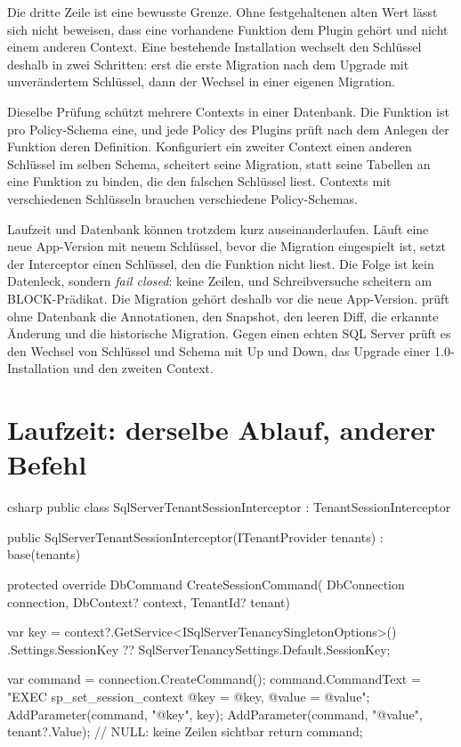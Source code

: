 Die dritte Zeile ist eine bewusste Grenze. Ohne festgehaltenen alten Wert lässt sich nicht
beweisen, dass eine vorhandene Funktion dem Plugin gehört und nicht einem anderen Context.
Eine bestehende Installation wechselt den Schlüssel deshalb in zwei Schritten: erst die erste
Migration nach dem Upgrade mit unverändertem Schlüssel, dann der Wechsel in einer eigenen
Migration.

Dieselbe Prüfung schützt mehrere Contexts in einer Datenbank. Die Funktion ist pro
Policy-Schema eine, und jede Policy des Plugins prüft nach dem Anlegen der Funktion deren
Definition. Konfiguriert ein zweiter Context einen anderen Schlüssel im selben Schema, scheitert
seine Migration, statt seine Tabellen an eine Funktion zu binden, die den falschen Schlüssel
liest. Contexts mit verschiedenen Schlüsseln brauchen verschiedene Policy-Schemas.

Laufzeit und Datenbank können trotzdem kurz auseinanderlaufen. Läuft eine neue App-Version mit
neuem Schlüssel, bevor die Migration eingespielt ist, setzt der Interceptor einen Schlüssel, den
die Funktion nicht liest. Die Folge ist kein Datenleck, sondern \emph{fail closed}: keine Zeilen,
und Schreibversuche scheitern am BLOCK-Prädikat. Die Migration gehört deshalb vor die neue
App-Version. 
prüft ohne Datenbank die Annotationen, den Snapshot, den leeren Diff, die erkannte Änderung und
die historische Migration. Gegen einen echten SQL Server prüft es den Wechsel von Schlüssel und
Schema mit Up und Down, das Upgrade einer 1.0-Installation und den zweiten Context.

\section{Laufzeit: derselbe Ablauf, anderer Befehl}

\begin{sourcecode}{csharp}
public class SqlServerTenantSessionInterceptor : TenantSessionInterceptor
{
    public SqlServerTenantSessionInterceptor(ITenantProvider tenants)
        : base(tenants)
    {
    }

    protected override DbCommand CreateSessionCommand(
        DbConnection connection, DbContext? context, TenantId? tenant)
    {
        var key = context?.GetService<ISqlServerTenancySingletonOptions>()
                      .Settings.SessionKey
                  ?? SqlServerTenancySettings.Default.SessionKey;

        var command = connection.CreateCommand();
        command.CommandText = "EXEC sp_set_session_context @key = @key, @value = @value";
        AddParameter(command, "@key", key);
        AddParameter(command, "@value", tenant?.Value);    // NULL: keine Zeilen sichtbar
        return command;
    }
}
\end{sourcecode}

